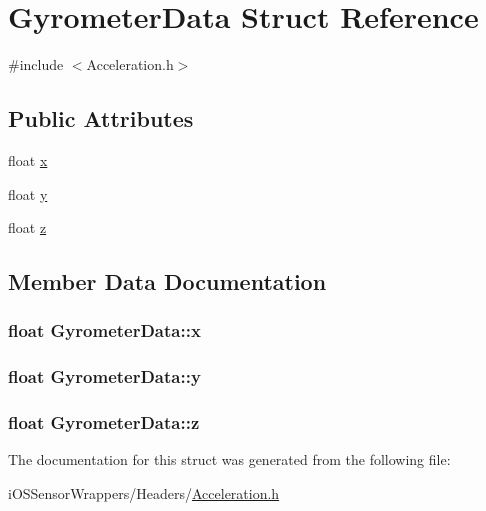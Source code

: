 \hypertarget{struct_gyrometer_data}{\section{Gyrometer\+Data Struct Reference}
\label{struct_gyrometer_data}
}


{\ttfamily \#include $<$Acceleration.\+h$>$}

\subsection*{Public Attributes}
\begin{DoxyCompactItemize}
\item 
float \hyperlink{struct_gyrometer_data_aa41d623b1e9547c10ee44159a6d5db1f}{x}
\item 
float \hyperlink{struct_gyrometer_data_a8bfd159a6f023fd90396425f23acb52d}{y}
\item 
float \hyperlink{struct_gyrometer_data_aef98320fd8b42a60a7bb8b424bea6f62}{z}
\end{DoxyCompactItemize}


\subsection{Member Data Documentation}
\hypertarget{struct_gyrometer_data_aa41d623b1e9547c10ee44159a6d5db1f}{
\subsubsection[{x}]{\setlength{\rightskip}{0pt plus 5cm}float Gyrometer\+Data\+::x}}\label{struct_gyrometer_data_aa41d623b1e9547c10ee44159a6d5db1f}
\hypertarget{struct_gyrometer_data_a8bfd159a6f023fd90396425f23acb52d}{
\subsubsection[{y}]{\setlength{\rightskip}{0pt plus 5cm}float Gyrometer\+Data\+::y}}\label{struct_gyrometer_data_a8bfd159a6f023fd90396425f23acb52d}
\hypertarget{struct_gyrometer_data_aef98320fd8b42a60a7bb8b424bea6f62}{
\subsubsection[{z}]{\setlength{\rightskip}{0pt plus 5cm}float Gyrometer\+Data\+::z}}\label{struct_gyrometer_data_aef98320fd8b42a60a7bb8b424bea6f62}


The documentation for this struct was generated from the following file\+:\begin{DoxyCompactItemize}
\item 
i\+O\+S\+Sensor\+Wrappers/\+Headers/\hyperlink{_acceleration_8h}{Acceleration.\+h}\end{DoxyCompactItemize}
